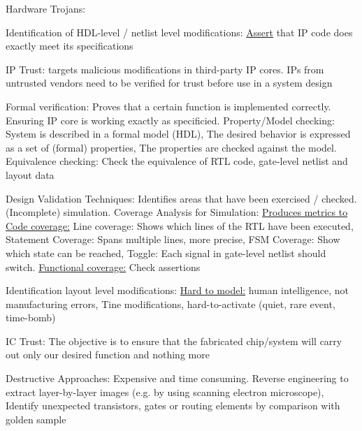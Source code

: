 \documentclass[landscape, a4paper]{article}
\begin{document}
\begin{minipage}[t]{0.2\linewidth}
\begin{betterlist}
		\item \alert{Hardware Trojans:}
		\begin{betterlist}
			\item \alert{Identification of HDL-level / netlist level modifications:} \underline{Assert} that IP code does \alert{exactly} meet its specifications
			\begin{betterlist}
				\item \alert{IP Trust:} targets malicious modifications in third-party IP cores. IPs from untrusted vendors need to be verified for trust before use in a system design
				\item \alert{Formal verification:} Proves that a certain function is implemented correctly. Ensuring IP core is working exactly as specificied. \alert{Property/Model checking:} System is described in a formal model (HDL), The desired behavior is expressed as a set of (formal) properties, The properties are checked against the model. \alert{Equivalence checking:} Check the equivalence of RTL code, gate-level netlist and layout data
				\item \alert{Design Validation Techniques:} Identifies areas that have been exercised / checked. \alert{(Incomplete) simulation}. \alert{Coverage Analysis for Simulation:} \uline{Produces metrics to Code coverage:} \alert{Line coverage:} Shows which lines of the RTL have been executed, \alert{Statement Coverage:} Spans multiple lines, more precise, \alert{FSM Coverage:} Show which state can be reached, \alert{Toggle:} Each signal in gate-level netlist should switch. \uline{Functional coverage:} Check assertions
			\end{betterlist}
			\item \alert{Identification layout level modifications:} \uline{Hard to model:} human intelligence, not manufacturing errors, Tine modifications, hard-to-activate (quiet, rare event, time-bomb)
			\begin{betterlist}
				\item \alert{IC Trust:} The objective is to ensure that the fabricated chip/system will carry out only our desired function and nothing more
				\item \alert{Destructive Approaches:} Expensive and time consuming. Reverse engineering to extract layer-by-layer images (e.g. by using scanning electron microscope), Identify unexpected transistors, gates or routing elements by comparison with golden sample

\end{betterlist}
\end{betterlist}
\end{betterlist}
\end{minipage}
\end{document}
